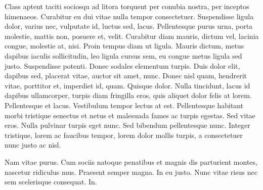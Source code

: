 \documentclass[../hdr.tex]{subfiles}
\begin{document}
Class aptent taciti sociosqu ad litora torquent per conubia nostra, per inceptos
himenaeos. Curabitur eu dui vitae nulla tempor consectetuer. Suspendisse ligula
dolor, varius nec, vulputate id, luctus sed, lacus. Pellentesque purus urna,
porta molestie, mattis non, posuere et, velit. Curabitur diam mauris, dictum
vel, lacinia congue, molestie at, nisi. Proin tempus diam ut ligula. Mauris
dictum, metus dapibus iaculis sollicitudin, leo ligula cursus sem, eu congue
metus ligula sed justo. Suspendisse potenti. Donec sodales elementum turpis.
Duis dolor elit, dapibus sed, placerat vitae, auctor sit amet, nunc. Donec nisl
quam, hendrerit vitae, porttitor et, imperdiet id, quam. Quisque dolor. Nulla
tincidunt, lacus id dapibus ullamcorper, turpis diam fringilla eros, quis
aliquet dolor felis at lorem. Pellentesque et lacus. Vestibulum tempor lectus at
est. Pellentesque habitant morbi tristique senectus et netus et malesuada fames
ac turpis egestas. Sed vitae eros. Nulla pulvinar turpis eget nunc. Sed bibendum
pellentesque nunc. Integer tristique, lorem ac faucibus tempor, lorem dolor
mollis turpis, a consectetuer nunc justo ac nisl.

Nam vitae purus. Cum sociis natoque penatibus et magnis dis parturient montes,
nascetur ridiculus mus. Praesent semper magna. In eu justo. Nunc vitae risus nec
sem scelerisque consequat. In.




\ifSubfilesClassLoaded{%
\printbibliography
}{%
  \vskip2cm
}
\end{document}
